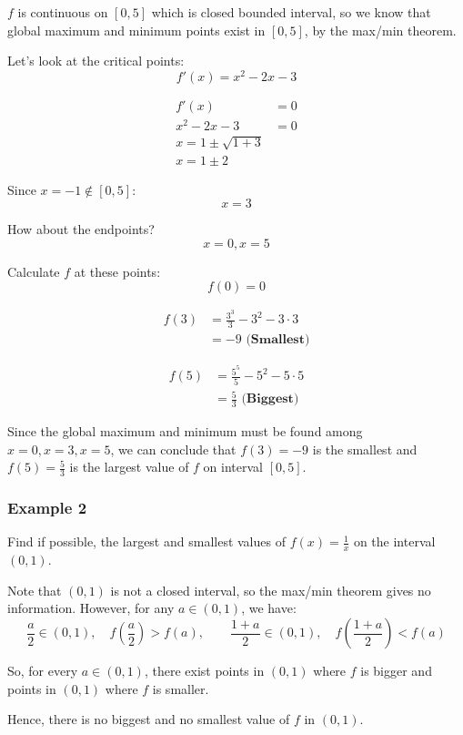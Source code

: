 \documentclass[11pt]{article}
\begin{document}
\(f\) is continuous on \([0, 5]\) which is closed bounded interval, so we know that global maximum and minimum points exist in \([0, 5]\), by the max/min theorem.


Let's look at the critical points:
\[f'(x) = x^2 - 2x - 3\]

\begin{align*}
f'(x) &= 0 \\
x^2 - 2x - 3 &= 0 \\
x = 1 \pm \sqrt{1 + 3} \\
x = 1 \pm 2
\end{align*}

Since \(x = -1 \notin [0, 5]\):
\[x = 3\]

How about the endpoints?
\[x = 0, x = 5\]

Calculate \(f\) at these points:
\[f(0) = 0\]

\begin{align*}
f(3) &= \frac{3^3}{3} - 3^2 - 3 \cdot 3 \\
&= -9 \textbf{ (Smallest)}
\end{align*}

\begin{align*}
f(5) &= \frac{5^5}{5} - 5^2 - 5 \cdot 5 \\
&= \frac{5}{3} \textbf{ (Biggest)}
\end{align*}

Since the global maximum and minimum must be found among \(x = 0, x = 3, x = 5\), we can conclude that \(f(3) = -9\) is the smallest and \(f(5) = \frac{5}{3}\) is the largest value of \(f\) on interval \([0, 5]\).
\subsubsection{Example 2}
\label{sec:orgc7baad3}
Find if possible, the largest and smallest values of \(f(x) = \frac{1}{x}\) on the interval \((0, 1)\).


Note that \((0, 1)\) is not a closed interval, so the max/min theorem gives no information. However, for any \(a \in (0, 1)\), we have:
\[\frac{a}{2} \in (0, 1), \quad f \left(\frac{a}{2} \right) > f(a), \qquad \frac{1 + a}{2} \in (0, 1), \quad f \left(\frac{1 + a}{2} \right) < f(a)\]

So, for every \(a \in (0, 1)\), there exist points in \((0, 1)\) where \(f\) is bigger and points in \((0, 1)\) where \(f\) is smaller.


Hence, there is no biggest and no smallest value of \(f\) in \((0, 1)\).
\end{document}
